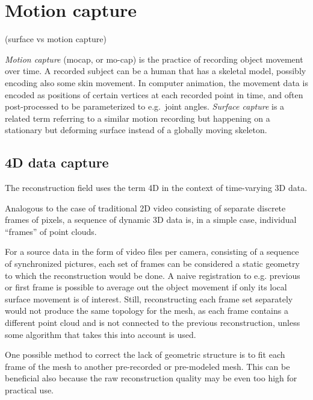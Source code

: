 \clearpage
\section{Motion capture}

(surface vs motion capture)

\emph{Motion capture} (mocap, or mo-cap) is the practice of recording object movement over time.
A recorded subject can be a human that has a skeletal model, possibly encoding also some skin movement.
In computer animation, the movement data is encoded as positions of certain vertices at each recorded point in time, and often post-processed to be parameterized to e.g.\ joint angles.
\emph{Surface capture} is a related term referring to a similar motion recording but happening on a stationary but deforming surface instead of a globally moving skeleton.



\subsection{4D data capture} %

The reconstruction field uses the term 4D in the context of time-varying 3D data.

Analogous to the case of traditional 2D video consisting of separate discrete frames of pixels, a sequence of dynamic 3D data is, in a simple case, individual ``frames'' of point clouds.

For a source data in the form of video files per camera, consisting of a sequence of synchronized pictures, each set of frames can be considered a static geometry to which the reconstruction would be done.
A naive registration to e.g. previous or first frame is possible to average out the object movement if only its local surface movement is of interest.
Still, reconstructing each frame set separately would not produce the same topology for the mesh, as each frame contains a different point cloud and is not connected to the previous reconstruction, unless some algorithm that takes this into account is used.

One possible method to correct the lack of geometric structure is to fit each frame of the mesh to another pre-recorded or pre-modeled mesh. \cite{somewhere,remedysoftware?}
This can be beneficial also because the raw reconstruction quality may be even too high for practical use.

